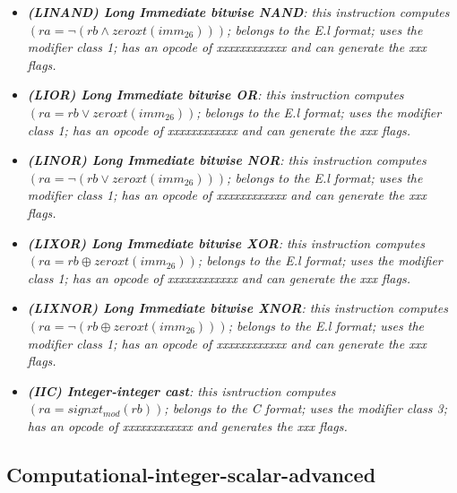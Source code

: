 \begin{multicols}{2}
\begin{itemize}
                \item \textit{\textbf{(LINAND) Long Immediate bitwise NAND}: this instruction computes \((ra = \neg(rb \wedge zeroxt(imm_{26})))\); belongs to the E.l format; uses the modifier class 1; has an opcode of xxxxxxxxxxxx and can generate the xxx flags.}

                \item \textit{\textbf{(LIOR) Long Immediate bitwise OR}: this instruction computes \((ra = rb \vee zeroxt(imm_{26}))\); belongs to the E.l format; uses the modifier class 1; has an opcode of xxxxxxxxxxxx and can generate the xxx flags.}

                \item \textit{\textbf{(LINOR) Long Immediate bitwise NOR}: this instruction computes \((ra = \neg(rb \vee zeroxt(imm_{26})))\); belongs to the E.l format; uses the modifier class 1; has an opcode of xxxxxxxxxxxx and can generate the xxx flags.}

                \item \textit{\textbf{(LIXOR) Long Immediate bitwise XOR}: this instruction computes \((ra = rb \oplus zeroxt(imm_{26}))\); belongs to the E.l format; uses the modifier class 1; has an opcode of xxxxxxxxxxxx and can generate the xxx flags.}

                \item \textit{\textbf{(LIXNOR) Long Immediate bitwise XNOR}: this instruction computes \((ra = \neg(rb \oplus zeroxt(imm_{26})))\); belongs to the E.l format; uses the modifier class 1; has an opcode of xxxxxxxxxxxx and can generate the xxx flags.}

                \item \textit{\textbf{(IIC) Integer-integer cast}: this isntruction computes \((ra = signxt_{mod}(rb))\); belongs to the C format; uses the modifier class 3; has an opcode of xxxxxxxxxxxx and generates the xxx flags.}

            \end{itemize}

        \end{multicols}

    \subsection{Computational-integer-scalar-advanced}

